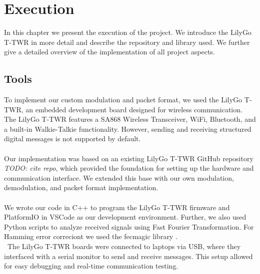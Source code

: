 \chapter{Execution}
In this chapter we present the execution of the project. We introduce the LilyGo T-TWR in more detail and describe the repository and library used. We further give a detailed overview of the implementation of all project aspects.
\section{Tools}
To implement our custom modulation and packet format, we used the LilyGo T-TWR, an embedded development board designed for wireless communication. The LilyGo T-TWR features a SA868 Wireless Transceiver, WiFi, Bluetooth, and a built-in Walkie-Talkie functionality. However, sending and receiving structured digital messages is not supported by default.
\\ \\
Our implementation was based on an existing LilyGo T-TWR GitHub repository \textit{TODO: cite repo}, which provided the foundation for setting up the hardware and communication interface. We extended this base with our own modulation, demodulation, and packet format implementation.
\\ \\
We wrote our code in C++ to program the LilyGo T-TWR firmware and PlatformIO in VSCode as our development environment. Further, we also used Python scripts to analyze received signals using Fast Fourier Transformation. For Hamming error correciont we used the fecmagic library \cite{kristof2020}.
\\ \ 
The LilyGo T-TWR boards were connected to laptops via USB, where they interfaced with a serial monitor to send and receive messages. This setup allowed for easy debugging and real-time communication testing.

